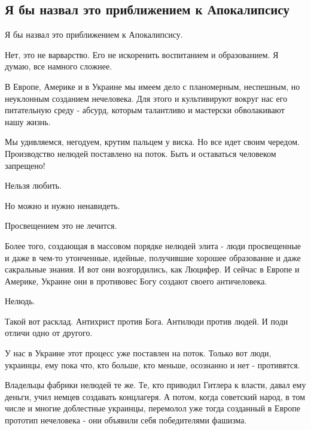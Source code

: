  
 
 
 
 
\subsection{Я бы назвал это приближением к Апокалипсису}
\label{sec:13_04_2021.fb.mischishin_mihail.1.chelovek_ukraina_neludi}

Я бы назвал это приближением к Апокалипсису.

Нет, это не варварство. Его не искоренить воспитанием и образованием. Я думаю, все намного сложнее.

В Европе, Америке и в Украине мы имеем дело с планомерным, неспешным, но
неуклонным созданием нечеловека. Для этого и культивируют вокруг нас его
питательную среду - абсурд, которым талантливо и мастерски обволакивают нашу
жизнь.

Мы удивляемся, негодуем, крутим пальцем у виска. Но все идет своим чередом.
Производство нелюдей поставлено на поток. Быть и оставаться человеком
запрещено!

Нельзя любить.

Но можно и нужно ненавидеть.

Просвещением это не лечится.

Более того, создающая в массовом порядке нелюдей элита - люди просвещенные и
даже в чем-то утонченные, идейные, получившие хорошее образование и даже
сакральные знания. И вот они возгордились, как Люцифер. И сейчас в Европе и
Америке, Украине они в противовес Богу создают своего античеловека.

Нелюдь.

Такой вот расклад. Антихрист против Бога. Антилюди против людей. И поди отличи
одно от другого.

У нас в Украине этот процесс уже поставлен на поток. Только вот люди, украинцы,
ему пока что, кто больше, кто меньше, осознанно и нет - противятся.

Владельцы фабрики нелюдей те же. Те, кто приводил Гитлера к власти, давал ему
деньги, учил немцев создавать концлагеря. А потом, когда советский народ, в том
числе и многие доблестные украинцы, перемолол уже тогда созданный в Европе
прототип нечеловека - они объявили себя победителями фашизма.

